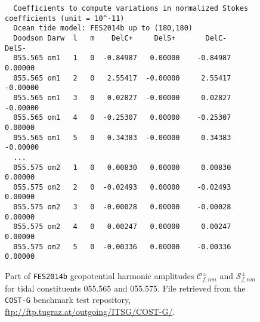 \begin{figure}
  \begin{adjustbox}{max width=\linewidth , fbox=0.5pt}
  \begin{BVerbatim}
  Coefficients to compute variations in normalized Stokes coefficients (unit = 10^-11)
  Ocean tide model: FES2014b up to (180,180)
  Doodson Darw  l   m    DelC+     DelS+       DelC-     DelS-
  055.565 om1   1   0  -0.84987   0.00000    -0.84987   0.00000
  055.565 om1   2   0   2.55417  -0.00000     2.55417  -0.00000
  055.565 om1   3   0   0.02827  -0.00000     0.02827  -0.00000
  055.565 om1   4   0  -0.25307   0.00000    -0.25307   0.00000
  055.565 om1   5   0   0.34383  -0.00000     0.34383  -0.00000
  ...
  055.575 om2   1   0   0.00830   0.00000     0.00830   0.00000   
  055.575 om2   2   0  -0.02493   0.00000    -0.02493   0.00000   
  055.575 om2   3   0  -0.00028   0.00000    -0.00028   0.00000   
  055.575 om2   4   0   0.00247   0.00000     0.00247   0.00000   
  055.575 om2   5   0  -0.00336   0.00000    -0.00336   0.00000   
  \end{BVerbatim}
  \end{adjustbox}
  \caption{Part of \texttt{FES2014b} geopotential harmonic amplitudes
  $\mathcal{C}_{f,nm}^{\pm}$ and $\mathcal{S}_{f,nm}^{\pm}$ for tidal constituents
  055.565 and 055.575. File retrieved from the \texttt{COST-G} benchmark test 
  repository, \url{ftp://ftp.tugraz.at/outgoing/ITSG/COST-G/}.}
  \label{fig:part-of-fes2014b}
\end{figure}

